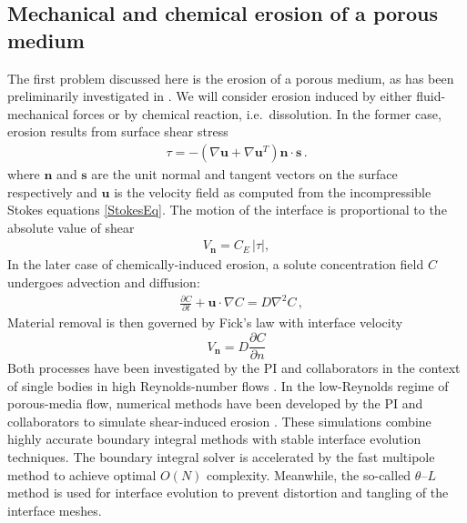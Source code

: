 \documentclass[12pt]{article}
\newcommand{\pd}[2]{ \frac{ \partial #1}{ \partial #2 } }
\newcommand{\bvec}[1]{{\mathbf{#1}}}
\newcommand{\grad}{\nabla}
\newcommand {\Lap} {\grad^2}
\newcommand{\abs}[1]{\left| #1 \right|}
\newcommand{\uu}{\bvec{u}}
\newcommand{\nn}{{\mathbf{n}}}
\renewcommand{\ss}{{\mathbf{s}}}
\newcommand{\Vn}{V_\nn}
\newcommand{\CE}{C_E}
\newcommand {\ny}{n}
\newcommand {\bdry} {\partial B}
\newcommand{\Diff}{D}
\newcommand{\thL}{$\theta$--$L$}
\begin{document}
\subsection{Mechanical and chemical erosion of a porous medium}


The first problem discussed here is the erosion of a porous medium, as has been preliminarily investigated in \cite{Quaife2018}. We will consider erosion induced by either fluid-mechanical forces or by chemical reaction, i.e.~dissolution. In the former case, erosion results from surface shear stress
\begin{align}
\tau = -\left(\nabla \uu + \nabla \uu^T \right)\nn \cdot \ss \, .
\end{align}
where $\nn$ and $\ss$ are the unit normal and tangent vectors on the surface respectively and $\uu$ is the velocity field as computed from the incompressible Stokes equations \eqref{StokesEq}. 
The motion of the interface is proportional to the absolute value of shear
\begin{align}
\Vn = \CE \, \abs{\tau},
\end{align}
In the later case of chemically-induced erosion, a solute concentration field $C$ undergoes advection and diffusion:
\begin{align}
\label{Ceq}
& \pd{C}{t} + \uu \cdot \grad C = \Diff \Lap C \, ,
\end{align}
Material removal is then governed by Fick's law with interface velocity
\begin{equation}
\label{DissVn}
\Vn = \left. \Diff \pd{C}{\ny} \right. %
\end{equation}
Both processes have been investigated by the PI and collaborators in the context of single bodies in high Reynolds-number flows \cite{Ristroph2012, MoorePOF2013, HuangJFM2015, MooreCPAM2017}. In the low-Reynolds regime of porous-media flow, numerical methods have been developed by the PI and collaborators to simulate shear-induced erosion \cite{Quaife2018}. These simulations combine highly accurate boundary integral methods with stable interface evolution techniques. The boundary integral solver is accelerated by the fast multipole method \cite{gre-rok1987, gre-gre-may1992} to achieve optimal $O(N)$ complexity. Meanwhile, the so-called {\thL} method is used for interface evolution to prevent distortion and tangling of the interface meshes.
\end{document}
